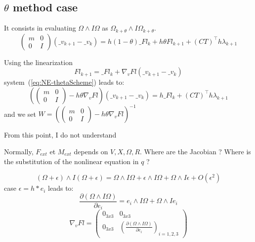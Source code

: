 \subsection{$\theta$ method case}
It consists in evaluating $\Omega  \wedge I\Omega $ as $\Omega _{k+\theta}  \wedge I\Omega _{k+\theta} $.
\begin{equation}
  \left(\begin{array}{cc} m&0\\0&I\end{array}\right)
   (\_v_{k+1}-\_v_{k})=
   h (1-\theta)\_Fl_k + h \theta Fl_{k+1} +
   (CT)^\top h\lambda _{k+1}
  \label{eq:NE-thetaScheme} 
 \end{equation}

Using the linearization $$Fl_{k+1} = \_Fl_{k}+\nabla _v Fl (\_v_{k+1}-\_v_{k})$$system~(\ref{eq:NE-thetaScheme}) leads to:
\begin{equation}
  \left(\left(\begin{array}{cc} m&0\\0&I\end{array}\right)-h\theta\nabla _v Fl\right)
   (\_v_{k+1}-\_v_{k})=
   h \_Fl_k + (CT)^\top h\lambda _{k+1}
  \end{equation}
and we set $W =  \left(\left(\begin{array}{cc} m&0\\0&I\end{array}\right)-h\theta\nabla _v Fl\right)^{-1} $


\begin{ndrva}
  From this point, I do not understand

  Normally, $F_{ext}$ et $M_{ext}$ depends on $V,X,\Omega, R$. Where are the Jacobian ?  Where  is the substitution of the nonlinear equation in $q$ ?
\end{ndrva}


\[ (\Omega+\epsilon)  \wedge I(\Omega+\epsilon)=  \Omega  \wedge I\Omega + \epsilon \wedge I \Omega +  \Omega  \wedge I \epsilon + O(\epsilon ^2)\]
case $\epsilon = h*e_i$ leads to:
\begin{equation}
  \label{eq:NE_nablaFL1}
  \frac{\partial (\Omega \wedge I\Omega)}{\partial e_i}=e_i\wedge I\Omega+\Omega \wedge Ie_i
  \end{equation}
\[\nabla _v Fl = \left(\begin{array}{cc}
0_{3x3}&0_{3x3}\\
0_{3x3}&\left(\frac{\partial (\Omega \wedge I\Omega)}{\partial e_i}\right)_{i=1,2,3}
\end{array}\right)\]

